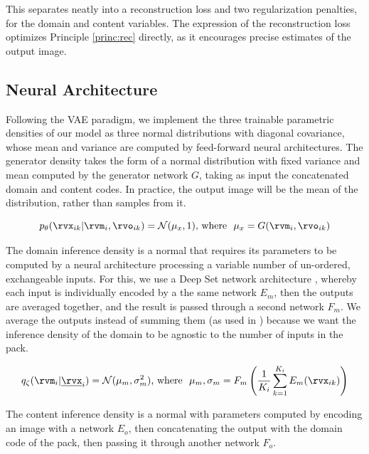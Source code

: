 \documentclass{article} %
\begin{document}
This separates neatly into a reconstruction loss and two regularization penalties, for the domain and content variables. The expression of the reconstruction loss optimizes Principle \ref{princ:rec} directly, as it encourages precise estimates of the output image.

\subsection{Neural Architecture}

Following the VAE paradigm, we implement the three trainable parametric densities of our model as three normal distributions with diagonal covariance, whose mean and variance are computed by feed-forward neural architectures. The generator density takes the form of a normal distribution with fixed variance and mean computed by the generator network $G$, taking as input the concatenated domain and content codes. In practice, the output image will be the mean of the distribution, rather than samples from it.

\begin{equation}
p_\theta (\rvx_{ik} | \rvm_i, \rvo_{ik}) = \mathcal{N}(\mu_x, 1) \textrm{, where } ~ \mu_x = G(\rvm_i, \rvo_{ik})    
\end{equation}

The domain inference density is a normal that requires its parameters to be computed by a neural architecture processing a variable number of un-ordered, exchangeable inputs. For this, we use a Deep Set network architecture \citep{zaheer2017deep}, whereby each input is individually encoded by a the same network $E_m$, then the outputs are averaged together, and the result is passed through a second network $F_m$. We average the outputs instead of summing them (as used in \citet{zaheer2017deep}) because we want the inference density of the domain to be agnostic to the number of inputs in the pack.

\begin{equation}
q_\zeta (\rvm_i | \underline{\rvx}_i) = \mathcal{N}(\mu_m, \sigma_m^2) \textrm{, where } ~ \mu_m, \sigma_m = F_m \left( \frac{1}{K_i} \sum_{k=1}^{K_i} E_m(\rvx_{ik}) \right)  
\end{equation}

The content inference density is a normal with parameters computed by encoding an image with a network $E_o$, then concatenating the output with the domain code of the pack, then passing it through another network $F_o$.
\end{document}
